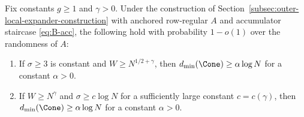 \begin{theorem}
\label{thm:outer-local-expander-logdist-regimes}
Fix constants $g\ge 1$ and $\gamma>0$.
Under the construction of Section~\ref{subsec:outer-local-expander-construction} with anchored row-regular $A$ and
accumulator staircase \eqref{eq:B-acc}, the following hold with probability $1-o(1)$ over the randomness of $A$:
\begin{enumerate}
\item[\textup{(R1)}] If $\sigma\ge 3$ is constant and $W\ge N^{1/2+\gamma}$, then
      $d_{\min}(\Cone)\ge \alpha\log N$ for a constant $\alpha>0$.
\item[\textup{(R2)}] If $W\ge N^{\gamma}$ and $\sigma\ge c\log N$ for a sufficiently large constant $c=c(\gamma)$, then
      $d_{\min}(\Cone)\ge \alpha\log N$ for a constant $\alpha>0$.
\end{enumerate}
\end{theorem}

